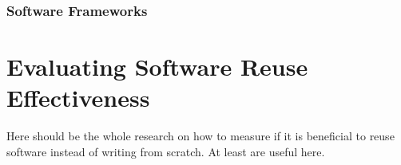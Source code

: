 
\subsubsection{Software Frameworks}





\section{Evaluating Software Reuse Effectiveness}

Here should be the whole research on how to measure if it is beneficial to reuse software instead of writing from scratch. At least \citet{mohagheghi_empirical_2008,frakes_software_1996,selby_enabling_2005} are useful here.
